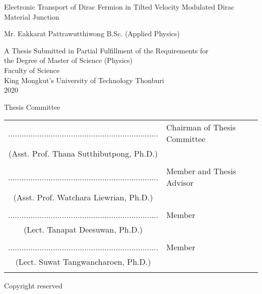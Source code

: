 \begin{center}
    Electronic Transport of Dirac Fermion in Tilted Velocity Modulated Dirac Material Junction
    \\

    \vspace{1.5cm}

    Mr. Eakkarat    Pattrawutthiwong  B.Sc. (Applied Physics) \\

    \vspace{1.5cm}

    A Thesis Submitted in Partial Fulfillment of the Requirements for\\
    the Degree of Master of Science  (Physics) \\
    Faculty of Science \\
    King Mongkut's University of Technology Thonburi \\
    2020 \\
\end{center}

    \vspace{.3cm}\noindent Thesis Committee \vspace{1cm}

\noindent \begin{tabular}{cl}

    ...................................................................&   \hspace{0.3in} Chairman of Thesis Committee \\
    \noindent(Asst. Prof. Thana Sutthibutpong, Ph.D.)  & \\ \\

    ...................................................................&   \hspace{0.3in} Member and Thesis Advisor\\
    (Asst. Prof. Watchara Liewrian, Ph.D.)  & \\ \\

    ...................................................................&   \hspace{0.3in} Member\\
    (Lect. Tanapat Deesuwan, Ph.D.)  & \\ \\

    ...................................................................&   \hspace{0.3in} Member \\
    (Lect. Suwat Tangwancharoen, Ph.D.)  & \\ \\

\end{tabular}

\begin{center}
    Copyright reserved
\end{center}
